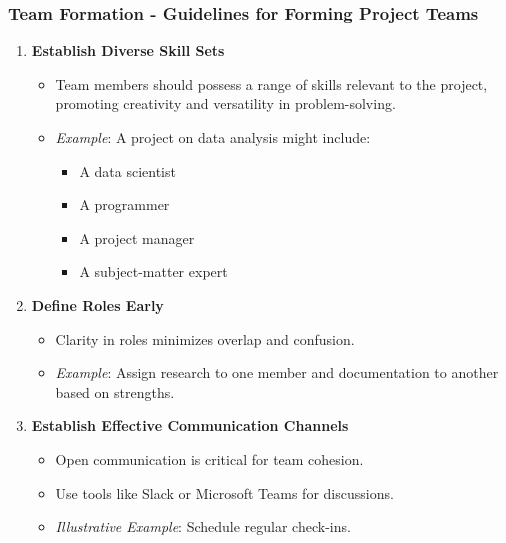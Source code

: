 \documentclass[aspectratio=169]{beamer}
\begin{document}
\begin{frame}[fragile]
    \frametitle{Team Formation - Guidelines for Forming Project Teams}

    \begin{enumerate}
        \item \textbf{Establish Diverse Skill Sets}
        \begin{itemize}
            \item Team members should possess a range of skills relevant to the project, promoting creativity and versatility in problem-solving.
            \item \textit{Example}: A project on data analysis might include:
            \begin{itemize}
                \item A data scientist
                \item A programmer
                \item A project manager
                \item A subject-matter expert
            \end{itemize}
        \end{itemize}

        \item \textbf{Define Roles Early}
        \begin{itemize}
            \item Clarity in roles minimizes overlap and confusion.
            \item \textit{Example}: Assign research to one member and documentation to another based on strengths.
        \end{itemize}

        \item \textbf{Establish Effective Communication Channels}
        \begin{itemize}
            \item Open communication is critical for team cohesion.
            \item Use tools like Slack or Microsoft Teams for discussions.
            \item \textit{Illustrative Example}: Schedule regular check-ins.
        \end{itemize}
    \end{enumerate}
\end{frame}
\end{document}
